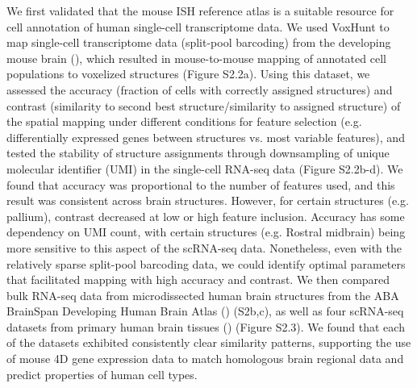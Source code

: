 We first validated that the mouse ISH reference atlas is a suitable resource for cell annotation of human single-cell transcriptome data. We used VoxHunt to map single-cell transcriptome data (split-pool barcoding) from the developing mouse brain (\cite{rosenberg_single-cell_2018}), which resulted in mouse-to-mouse mapping of annotated cell populations to voxelized structures (Figure S2.2a). Using this dataset, we assessed the accuracy (fraction of cells with correctly assigned structures) and contrast (similarity to second best structure/similarity to assigned structure) of the spatial mapping under different conditions for feature selection (e.g. differentially expressed genes between structures vs. most variable features), and tested the stability of structure assignments through downsampling of unique molecular identifier (UMI) in the single-cell RNA-seq data (Figure S2.2b-d). We found that accuracy was proportional to the number of features used, and this result was consistent across brain structures. However, for certain structures (e.g. pallium), contrast decreased at low or high feature inclusion. Accuracy has some dependency on UMI count, with certain structures (e.g. Rostral midbrain) being more sensitive to this aspect of the scRNA-seq data. Nonetheless, even with the relatively sparse split-pool barcoding data, we could identify optimal parameters that facilitated mapping with high accuracy and contrast. We then compared bulk RNA-seq data from microdissected human brain structures from the ABA BrainSpan Developing Human Brain Atlas (\cite{thompson_high-resolution_2014}) (S2b,c), as well as four scRNA-seq datasets from primary human brain tissues (\cite{fan_spatial_2018,nowakowski_spatiotemporal_2017,polioudakis_single-cell_2019,zhong_single-cell_2018}) (Figure S2.3). We found that each of the datasets exhibited consistently clear similarity patterns, supporting the use of mouse 4D gene expression data to match homologous brain regional data and predict properties of human cell types.



